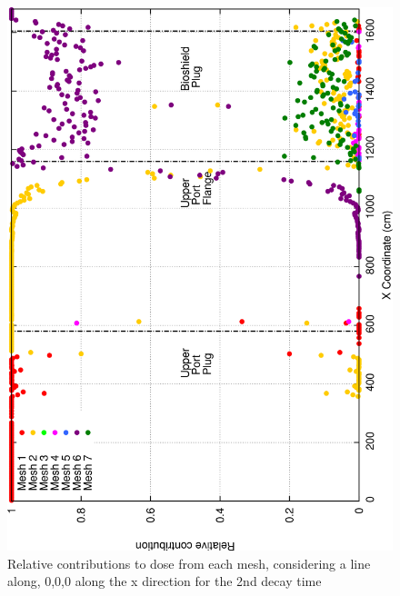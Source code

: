 \documentclass[12pt]{article}
\begin{document}
\begin{figure}[ht!]
\centering
\includegraphics[clip,scale=0.25]{../plots/crosstalk/nob4c/up/dc2_rel.png}
\caption{Relative contributions to dose from each mesh, considering a line along, 0,0,0 along the x direction for the 2nd decay time}
\label{fig:ct_up_dc2_rel}
\end{figure}
\end{document}
